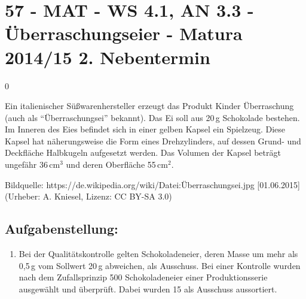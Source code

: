 \section{57 - MAT - WS 4.1, AN 3.3 - Überraschungseier - Matura 2014/15 2. Nebentermin}

\begin{langesbeispiel} \item[0] %
	
Ein italienischer Süßwarenhersteller erzeugt das Produkt Kinder Überraschung (auch als "`Überraschungsei"' bekannt). Das Ei soll aus 20\,g Schokolade bestehen. Im Inneren des Eies befindet sich in einer gelben Kapsel ein Spielzeug. Diese Kapsel hat näherungsweise die Form eines Drehzylinders, auf dessen Grund- und Deckfläche Halbkugeln aufgesetzt werden. Das Volumen der Kapsel beträgt ungefähr 36\,cm$^3$ und deren Oberfläche 55\,cm$^2$.

\begin{center}
\end{center}
\begin{scriptsize}\begin{singlespace}Bildquelle: https://de.wikipedia.org/wiki/Datei:Überraschungsei.jpg [01.06.2015] (Urheber: A. Kniesel, Lizenz: CC BY-SA 3.0)\end{singlespace}\end{scriptsize}

\subsection{Aufgabenstellung:}
\begin{enumerate}
	\item Bei der Qualitätskontrolle gelten Schokoladeneier, deren Masse um mehr als 0,5\,g vom Sollwert 20\,g abweichen, als Ausschuss. Bei einer Kontrolle wurden nach dem Zufallsprinzip 500 Schokoladeneier einer Produktionsserie ausgewählt und überprüft. Dabei wurden 15 als Ausschuss aussortiert.\leer
	

\end{enumerate}
\end{langesbeispiel}
